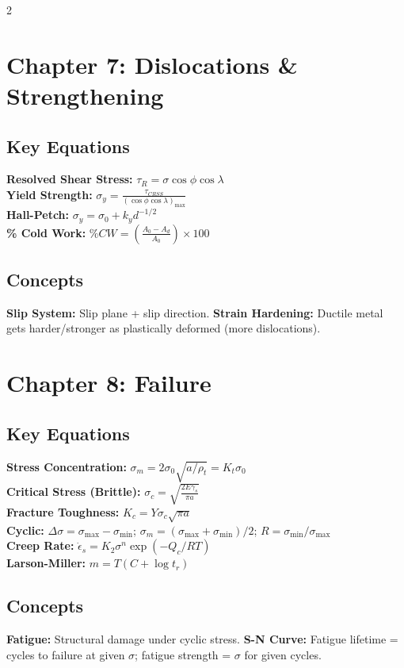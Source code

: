 \documentclass[8pt]{extarticle}
\begin{document}
\begin{multicols*}{2}
\section*{Chapter 7: Dislocations \& Strengthening}
\subsection*{Key Equations}
\textbf{Resolved Shear Stress:} $\tau_R = \sigma\cos\phi\cos\lambda$ \\
\textbf{Yield Strength:} $\sigma_y = \frac{\tau_{CRSS}}{(\cos\phi\cos\lambda)_{\max}}$ \\
\textbf{Hall-Petch:} $\sigma_y = \sigma_0 + k_y d^{-1/2}$ \\
\textbf{\% Cold Work:} $\%CW = \left(\frac{A_0 - A_d}{A_0}\right)\times100$
\subsection*{Concepts}
\textbf{Slip System:} Slip plane + slip direction. \textbf{Strain Hardening:} Ductile metal gets harder/stronger as plastically deformed (more dislocations).

\section*{Chapter 8: Failure}
\subsection*{Key Equations}
\textbf{Stress Concentration:} $\sigma_m = 2\sigma_0\sqrt{a/\rho_t} = K_t\sigma_0$ \\
\textbf{Critical Stress (Brittle):} $\sigma_c = \sqrt{\frac{2E\gamma_s}{\pi a}}$ \\
\textbf{Fracture Toughness:} $K_c = Y\sigma_c\sqrt{\pi a}$ \\
\textbf{Cyclic:} $\Delta\sigma=\sigma_{\max}-\sigma_{\min}$; $\sigma_m=(\sigma_{\max}+\sigma_{\min})/2$; $R=\sigma_{\min}/\sigma_{\max}$ \\
\textbf{Creep Rate:} $\dot{\epsilon}_s = K_2\sigma^n\exp(-Q_c/RT)$ \\
\textbf{Larson-Miller:} $m=T(C+\log t_r)$
\subsection*{Concepts}
\textbf{Fatigue:} Structural damage under cyclic stress. \textbf{S-N Curve:} Fatigue lifetime = cycles to failure at given $\sigma$; fatigue strength = $\sigma$ for given cycles.


\end{multicols*}
\end{document}

